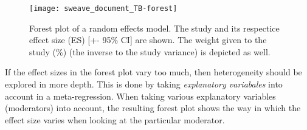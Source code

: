 \documentclass[11pt, a4paper]{article}
\begin{document}


\begin{figure}[!h]
\captionsetup{width=0.6\textwidth}
\centering
\texttt{[image: sweave\_document\_TB-forest]}
\caption{Forest plot of a random effects model. The study and its respectice effect size (ES) [+- 95\% CI] are shown. The weight given to the study (\%) (the inverse to the study variance) is depicted as well.}
\label{fig:forestplot}
\end{figure}

If the effect sizes in the forest plot vary too  much, then heterogeneity should be explored in more depth. This is done by taking \emph{explanatory variabales} into account in a meta-regression. When taking various explanatory variables (moderators) into account, the resulting forest plot shows the way in which the effect size varies when looking at the particular moderator. 


\bigskip
\bigskip

\end{document}
